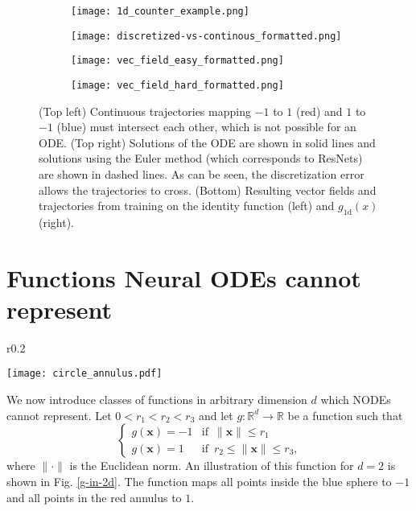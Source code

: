 \documentclass{article}
\begin{document}
\begin{figure}[t]
\centering
\begin{subfigure}[t]{0.37\linewidth}
\centering
\texttt{[image: 1d\_counter\_example.png]}
\end{subfigure}\hspace{0.05\linewidth}
\begin{subfigure}[t]{0.37\linewidth}
\centering
\texttt{[image: discretized-vs-continous\_formatted.png]}
\end{subfigure}
\begin{subfigure}[t]{0.37\linewidth}
\centering
\texttt{[image: vec\_field\_easy\_formatted.png]}
\end{subfigure}\hspace{0.05\linewidth}
\begin{subfigure}[t]{0.37\linewidth}
\centering
\texttt{[image: vec\_field\_hard\_formatted.png]}
\end{subfigure}
\setlength{\belowcaptionskip}{-10pt}
\caption{(Top left) Continuous trajectories mapping $-1$ to $1$ (red) and $1$ to $-1$ (blue) must intersect each other, which is not possible for an ODE. (Top right) Solutions of the ODE are shown in solid lines and solutions using the Euler method (which corresponds to ResNets) are shown in dashed lines. As can be seen, the discretization error allows the trajectories to cross. (Bottom) Resulting vector fields and trajectories from training on the identity function (left) and $g_{1\text{d}}(x)$ (right).}
\label{1d-experiments}

\end{figure}

\section{Functions Neural ODEs cannot represent}
\begin{wrapfigure}{r}{0.2\linewidth}
  \vspace{-25pt}
  \begin{center}
    \texttt{[image: circle\_annulus.pdf]}
  \end{center}
  \caption{Diagram of $g(\mathbf{x})$ for $d=2$.}
  \label{g-in-2d}
  \vskip -1cm
\end{wrapfigure}
We now introduce classes of functions in arbitrary dimension $d$ which NODEs cannot represent. Let $0 < r_1 < r_2 < r_3$ and let $g : \mathbb{R}^d \to \mathbb{R}$ be a function such that
\[
  \begin{cases}
       g(\mathbf{x}) = -1 & \text{if $\,\|\mathbf{x}\| \leq r_1$} \\
       g(\mathbf{x}) = 1 & \text{if $\,r_2 \leq \|\mathbf{x}\| \leq r_3$,} 
  \end{cases}
\]
where $\|\cdot\|$ is the Euclidean norm. An illustration of this function for $d=2$ is shown in Fig. \ref{g-in-2d}. The function maps all points inside the blue sphere to $-1$ and all points in the red annulus to $1$. 
\end{document}
